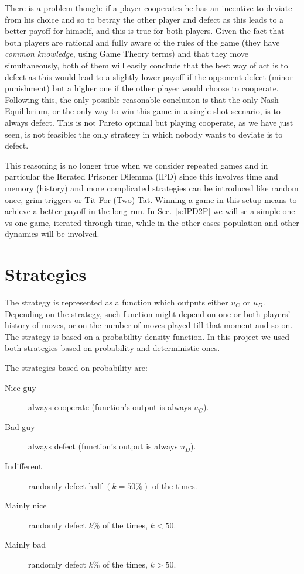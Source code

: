 \documentclass[journal,a4paper,10pt,twoside,draft=false]{IEEEtran}
\begin{document}
There is a problem though: if a player cooperates he has an incentive to deviate from his choice and so to betray the other player and defect as this leads to a better payoff for himself, and this is true for both players. 
Given the fact that both players are rational and fully aware of the rules of the game (they have \textit{common knowledge}, using Game Theory terms) and that they move simultaneously, both of them will easily conclude that the best way of act is to defect as this would lead to a slightly lower payoff if the opponent defect (minor punishment) but a higher one if the other player would choose to cooperate.
Following this, the only possible reasonable conclusion is that the only Nash Equilibrium, or the only way to win this game in a single-shot scenario, is to always defect.
This is not Pareto optimal but playing cooperate, as we have just seen, is not feasible: the only strategy in which nobody wants to deviate is to defect.

This reasoning is no longer true when we consider repeated games and in particular the Iterated Prisoner Dilemma (IPD) since this involves time and memory (history) and more complicated strategies can be introduced like random once, grim triggers or Tit For (Two) Tat.
Winning a game in this setup means to achieve a better payoff in the long run. In Sec.~\ref{s:IPD2P} we will se a simple one-vs-one game, iterated through time, while in the other cases population and other dynamics will be involved.

\section{Strategies} \label{s:str}
The strategy is represented as a function which outputs either $u_C$ or $u_D$. Depending on the strategy, such function might depend on one or both players' history of moves, or on the number of moves played till that moment and so on.
The strategy is based on a probability density function. In this project we used both strategies based on probability and deterministic ones.

The strategies based on probability are:

\begin{description}
    \item[Nice guy] always cooperate (function's output is always $u_C$).
    \item[Bad guy] always defect (function's output is always $u_D$).
    \item[Indifferent] randomly defect half $(k=50\%)$ of the times.
    \item[Mainly nice] randomly defect $k\%$ of the times, $k<50$.%
    \item[Mainly bad] randomly defect $k\%$ of the times, $k>50$.%
\end{description}
\end{document}

